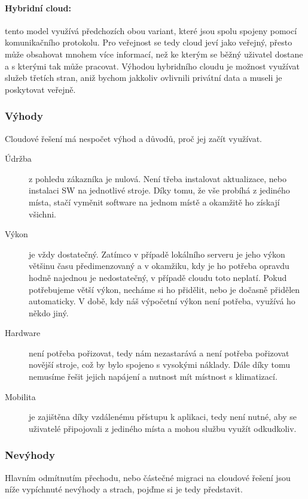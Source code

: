 \paragraph{Hybridní cloud:} tento model využívá předchozích obou variant, které jsou spolu spojeny pomocí komunikačního protokolu. Pro veřejnost se tedy cloud jeví jako veřejný, přesto může obsahovat mnohem více informací, než ke kterým se běžný uživatel dostane a s kterými tak může pracovat.
Výhodou hybridního cloudu je možnost využívat služeb třetích stran, aniž bychom jakkoliv ovlivnili privátní data a museli je poskytovat veřejně.

\subsubsection{Výhody}
Cloudové řešení má nespočet výhod a důvodů, proč jej začít využívat.

\begin{description}
  \item [Údržba] z pohledu zákazníka je nulová. Není třeba instalovat aktualizace, nebo instalaci SW na jednotlivé stroje. Díky tomu, že vše probíhá z jediného místa, stačí vyměnit software na jednom místě a okamžitě ho získají všichni.
	\item [Výkon] je vždy dostatečný. Zatímco v případě lokálního serveru je jeho výkon většinu času předimenzovaný a v okamžiku, kdy je ho potřeba opravdu hodně najednou je nedostatečný, v případě cloudu toto neplatí. Pokud potřebujeme větší výkon, necháme si ho přidělit, nebo je dočasně přidělen automaticky. V době, kdy náš výpočetní výkon není potřeba, využívá ho někdo jiný.
  \item [Hardware] není potřeba pořizovat, tedy nám nezastarává a není potřeba pořizovat novější stroje, což by bylo spojeno s vysokými náklady. Dále díky tomu nemusíme řešit jejich napájení a nutnost mít místnost s klimatizací.
  \item [Mobilita] je zajištěna díky vzdálenému přístupu k aplikaci, tedy není nutné, aby se uživatelé připojovali z jediného místa a mohou službu využít odkudkoliv.
\end{description}

\subsubsection{Nevýhody}
Hlavním odmítnutím přechodu, nebo částečné migraci na cloudové řešení jsou níže vypíchnuté nevýhody a strach, pojďme si je tedy představit.

